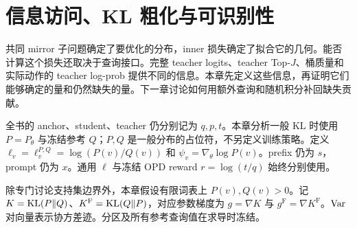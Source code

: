 \chapter{信息访问、KL 粗化与可识别性}
\label{inf:chapter}

共同 mirror 子问题确定了要优化的分布，inner 损失确定了拟合它的几何。能否计算这个损失还取决于查询接口。完整 teacher logits、teacher Top-$J$、桶质量和实际动作的 teacher log-prob 提供不同的信息。本章先定义这些信息，再证明它们能够确定的量和仍然缺失的量。下一章讨论如何用额外查询和随机积分补回缺失贡献。

全书的 anchor、student、teacher 仍分别记为 $q,p,t$。本章分析一般 KL 时使用 $P=P_\theta$ 与冻结参考 $Q$；$P,Q$ 是一般分布的占位符，不另定义训练策略。定义 $\ell_v=\ell_v^{P,Q}=\log(P(v)/Q(v))$ 和 $\psi_v=\nabla_\theta\log P(v)$。prefix 仍为 $s$，prompt 仍为 $x$。通用 $\ell$ 与冻结 OPD reward $r=\log(t/q)$ 始终分别使用。

除专门讨论支持集边界外，本章假设有限词表上 $P(v),Q(v)>0$。记 $K=\operatorname{KL}(P\Vert Q)$、$K^{\mathrm F}=\operatorname{KL}(Q\Vert P)$，对应参数梯度为 $g=\nabla K$ 与 $g^{\mathrm F}=\nabla K^{\mathrm F}$。$\operatorname{Var}$ 对向量表示协方差迹。分区及所有参考查询值在求导时冻结。




